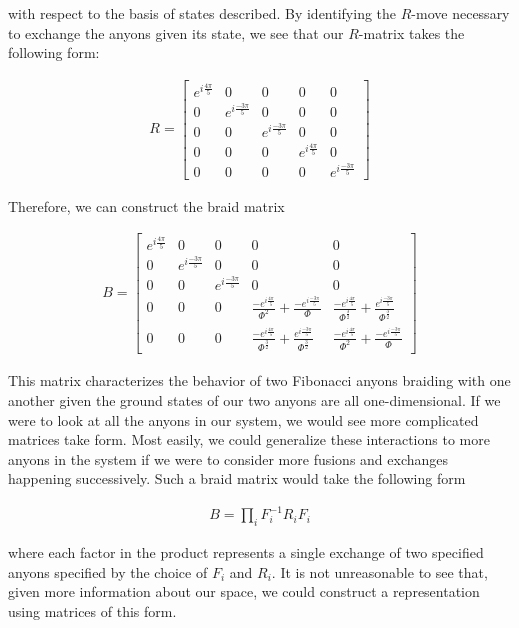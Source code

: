 with respect to the basis of states described. By identifying the $R$-move necessary to exchange the anyons given its state, we see that our $R$-matrix takes the following form:

\begin{equation}
	\begin{aligned}
		R = \begin{bmatrix}
				e^{i\frac{4\pi}{5}} & 0 & 0 & 0 & 0 \\
				0 & e^{i\frac{-3\pi}{5}} & 0 & 0 & 0 \\
				0 & 0 & e^{i\frac{-3\pi}{5}} & 0 & 0 \\
				0 & 0 & 0 & e^{i\frac{4\pi}{5}} & 0\\
				0 & 0 & 0 & 0 &e^{i\frac{-3\pi}{5}} 
			\end{bmatrix}
	\end{aligned}
\end{equation}

Therefore, we can construct the braid matrix

\begin{equation}
	\begin{aligned}
		B = \begin{bmatrix}
				e^{i\frac{4\pi}{5}} & 0 & 0 & 0 & 0 \\
				0 & e^{i\frac{-3\pi}{5}} & 0 & 0 & 0 \\
				0 & 0 & e^{i\frac{-3\pi}{5}} & 0 & 0 \\
				0 & 0 & 0 & \frac{-e^{i\frac{4\pi}{5}}}{\Phi^2} + \frac{-e^{i\frac{-3\pi}{5}}}{\Phi}& \frac{-e^{i\frac{4\pi}{5}}}{\Phi^\frac{3}{2}} + \frac{e^{i\frac{-3\pi}{5}}}{\Phi^\frac{3}{2}}\\
				0 & 0 & 0&\frac{-e^{i\frac{4\pi}{5}}}{\Phi^\frac{3}{2}} + \frac{e^{i\frac{-3\pi}{5}}}{\Phi^\frac{3}{2}} &\frac{-e^{i\frac{4\pi}{5}}}{\Phi^2} + \frac{-e^{i\frac{-3\pi}{5}}}{\Phi}
			\end{bmatrix}
	\end{aligned}
\end{equation}

This matrix characterizes the behavior of two Fibonacci anyons braiding with one another given the ground states of our two anyons are all one-dimensional. If we were to look at all the anyons in our system, we would see more complicated matrices take form. Most easily, we could generalize these interactions to more anyons in the system if we were to consider more fusions and exchanges happening successively. Such a braid matrix would take the following form

\begin{equation}
	\begin{aligned}
		B = \prod_i F_i^{-1}R_iF_i
	\end{aligned}
\end{equation}

where each factor in the product represents a single exchange of two specified anyons specified by the choice of $F_i$ and $R_i$. It is not unreasonable to see that, given more information about our space, we could construct a representation using matrices of this form.